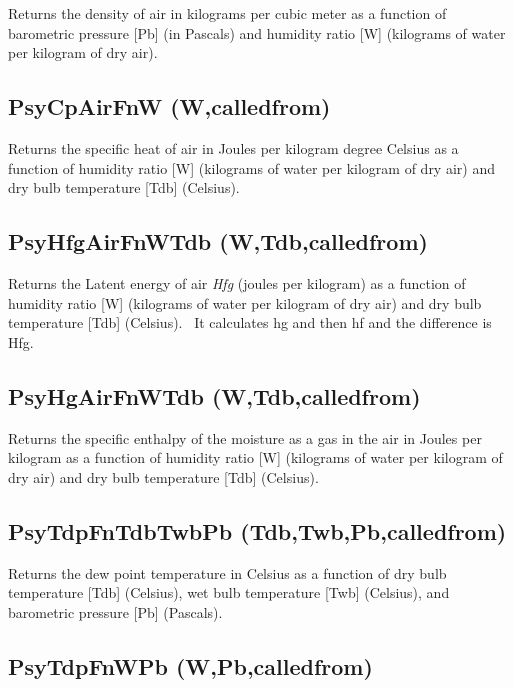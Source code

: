 Returns the density of air in kilograms per cubic meter as a function of barometric pressure {[}Pb{]} (in Pascals) and humidity ratio {[}W{]} (kilograms of water per kilogram of dry air).

\subsection{PsyCpAirFnW (W,calledfrom)}\label{psycpairfnw-wcalledfrom}

Returns the specific heat of air in Joules per kilogram degree Celsius as a function of humidity ratio {[}W{]} (kilograms of water per kilogram of dry air) and dry bulb temperature {[}Tdb{]} (Celsius).

\subsection{PsyHfgAirFnWTdb (W,Tdb,calledfrom)}\label{psyhfgairfnwtdb-wtdbcalledfrom}

Returns the Latent energy of air \emph{Hfg} (joules per kilogram) as a function of humidity ratio {[}W{]} (kilograms of water per kilogram of dry air) and dry bulb temperature {[}Tdb{]} (Celsius).~ It calculates hg and then hf and the difference is Hfg.

\subsection{PsyHgAirFnWTdb (W,Tdb,calledfrom)}\label{psyhgairfnwtdb-wtdbcalledfrom}

Returns the specific enthalpy of the moisture as a gas in the air in Joules per kilogram as a function of humidity ratio {[}W{]} (kilograms of water per kilogram of dry air) and dry bulb temperature {[}Tdb{]} (Celsius).

\subsection{PsyTdpFnTdbTwbPb (Tdb,Twb,Pb,calledfrom)}\label{psytdpfntdbtwbpb-tdbtwbpbcalledfrom}

Returns the dew point temperature in Celsius as a function of dry bulb temperature {[}Tdb{]} (Celsius), wet bulb temperature {[}Twb{]} (Celsius), and barometric pressure {[}Pb{]} (Pascals).

\subsection{PsyTdpFnWPb (W,Pb,calledfrom)}\label{psytdpfnwpb-wpbcalledfrom}

